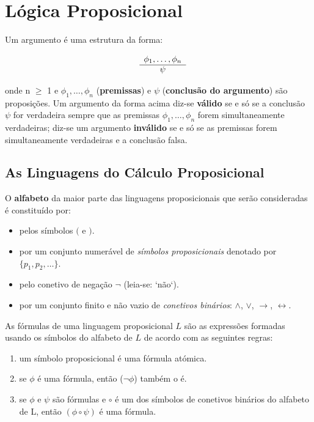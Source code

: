 \section{Lógica Proposicional}

\begin{definition}
    Um argumento é uma estrutura da forma:

    \[
    \begin{array}{ cc }
        & \phi_1, \ldots, \phi_n \\
        \cline{2-2}
        & \psi
    \end{array}
    \]

    onde n $\ge$ 1 e $\phi_1,\ldots{},\phi_n$ (\textbf{premissas}) e $\psi$ (\textbf{conclusão do argumento}) são proposições.
    Um argumento da forma acima diz-se \textbf{válido} se e só se a conclusão $\psi$ for verdadeira sempre que as premissas $\phi_1,\ldots,\phi_n$ forem simultaneamente verdadeiras; diz-se um argumento \textbf{inválido} se e só se as premissas forem simultaneamente verdadeiras e a conclusão falsa.

\end{definition}

\subsection{As Linguagens do Cálculo Proposicional}
O \textbf{alfabeto} da maior parte das linguagens proposicionais que serão consideradas é constituído por:

\begin{itemize}
    \item pelos símbolos $($ e $)$.
    \item por um conjunto numerável de \textit{símbolos proposicionais} denotado por $\{ p_1,p_2, \ldots \}$.
    \item pelo conetivo de negação $\neg$ (leia-se: `não`).
    \item por um conjunto finito e não vazio de \textit{conetivos binários}: $\land$, $\lor$, $\to$, $\leftrightarrow$.
\end{itemize}

As fórmulas de uma linguagem proposicional $L$ são as expressões formadas usando os símbolos do alfabeto de $L$ de acordo com as seguintes regras:

\begin{enumerate}[label=(\roman*)]
    \item um símbolo proposicional é uma fórmula atómica.
    \item se $\phi$ é uma fórmula, então ($\neg \phi$) também o é.
    \item se $\phi$ e $\psi$ são fórmulas e $\circ$ é um dos símbolos de conetivos binários do alfabeto de L, então $(\phi\circ\psi)$ é uma fórmula.
\end{enumerate}

